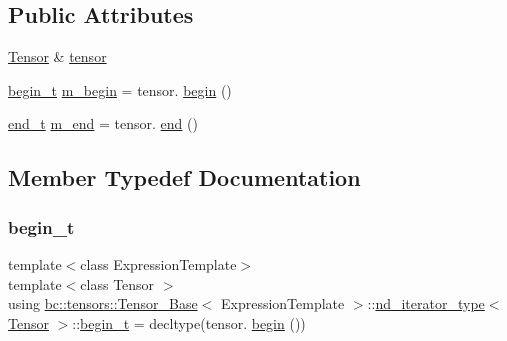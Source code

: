 \subsection*{Public Attributes}
\begin{DoxyCompactItemize}
\item 
\hyperlink{namespacebc_a659391e47ab612be3ba6c18cf9c89159}{Tensor} \& \hyperlink{structbc_1_1tensors_1_1Tensor__Base_1_1nd__iterator__type_a939845b78f09f5739c11f9e25f3b42bc}{tensor}
\item 
\hyperlink{structbc_1_1tensors_1_1Tensor__Base_1_1nd__iterator__type_a9b63eaeda87e319d02d937a5ebcb6cdf}{begin\+\_\+t} \hyperlink{structbc_1_1tensors_1_1Tensor__Base_1_1nd__iterator__type_a312d75e12f47abbe404193c95e15189d}{m\+\_\+begin} = tensor. \hyperlink{structbc_1_1tensors_1_1Tensor__Base_1_1nd__iterator__type_a430ba9b782f52539459544676f369e36}{begin} ()
\item 
\hyperlink{structbc_1_1tensors_1_1Tensor__Base_1_1nd__iterator__type_a3c6a8833df7b94e13446d929cd57e257}{end\+\_\+t} \hyperlink{structbc_1_1tensors_1_1Tensor__Base_1_1nd__iterator__type_ac90dbfab4c9da5f3139954951af80756}{m\+\_\+end} = tensor. \hyperlink{structbc_1_1tensors_1_1Tensor__Base_1_1nd__iterator__type_aa4eda31e9f2052dc1c555a5cd1e9b2bc}{end} ()
\end{DoxyCompactItemize}


\subsection{Member Typedef Documentation}
\mbox{\label{structbc_1_1tensors_1_1Tensor__Base_1_1nd__iterator__type_a9b63eaeda87e319d02d937a5ebcb6cdf}} 
\subsubsection{\texorpdfstring{begin\+\_\+t}{begin\_t}}
{\footnotesize\ttfamily template$<$class Expression\+Template$>$ \\
template$<$class Tensor $>$ \\
using \hyperlink{classbc_1_1tensors_1_1Tensor__Base}{bc\+::tensors\+::\+Tensor\+\_\+\+Base}$<$ Expression\+Template $>$\+::\hyperlink{structbc_1_1tensors_1_1Tensor__Base_1_1nd__iterator__type}{nd\+\_\+iterator\+\_\+type}$<$ \hyperlink{namespacebc_a659391e47ab612be3ba6c18cf9c89159}{Tensor} $>$\+::\hyperlink{structbc_1_1tensors_1_1Tensor__Base_1_1nd__iterator__type_a9b63eaeda87e319d02d937a5ebcb6cdf}{begin\+\_\+t} =  decltype(tensor. \hyperlink{structbc_1_1tensors_1_1Tensor__Base_1_1nd__iterator__type_a430ba9b782f52539459544676f369e36}{begin} ())}


